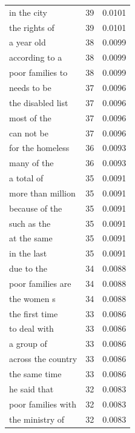 \begin{tabular}{lrl}
in the city & 39 & 0.0101 \\
the rights of & 39 & 0.0101 \\
a year old & 38 & 0.0099 \\
according to a & 38 & 0.0099 \\
poor families to & 38 & 0.0099 \\
needs to be & 37 & 0.0096 \\
the disabled list & 37 & 0.0096 \\
most of the & 37 & 0.0096 \\
can not be & 37 & 0.0096 \\
for the homeless & 36 & 0.0093 \\
many of the & 36 & 0.0093 \\
a total of & 35 & 0.0091 \\
more than million & 35 & 0.0091 \\
because of the & 35 & 0.0091 \\
such as the & 35 & 0.0091 \\
at the same & 35 & 0.0091 \\
in the last & 35 & 0.0091 \\
due to the & 34 & 0.0088 \\
poor families are & 34 & 0.0088 \\
the women s & 34 & 0.0088 \\
the first time & 33 & 0.0086 \\
to deal with & 33 & 0.0086 \\
a group of & 33 & 0.0086 \\
across the country & 33 & 0.0086 \\
the same time & 33 & 0.0086 \\
he said that & 32 & 0.0083 \\
poor families with & 32 & 0.0083 \\
the ministry of & 32 & 0.0083 \\
\bottomrule
\end{tabular}

